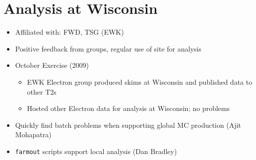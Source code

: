\documentclass{beamer}
\begin{document}
\section{Analysis at Wisconsin}
\begin{frame}
\begin{itemize}
	\item Affiliated with: FWD, TSG (EWK)
	\item Positive feedback from groups, regular use of site for analysis
	\item October Exercise (2009)
	\begin{itemize}
		\item EWK Electron group produced skims at Wisconsin and published data to other T2s
		\item Hosted other Electron data for analysis at Wisconsin; no problems
	\end{itemize}
	\item Quickly find batch problems when supporting global MC production (Ajit Mohapatra)
	\item {\tt farmout} scripts support local analysis (Dan Bradley) 
\end{itemize}
\end{frame}
\end{document}
